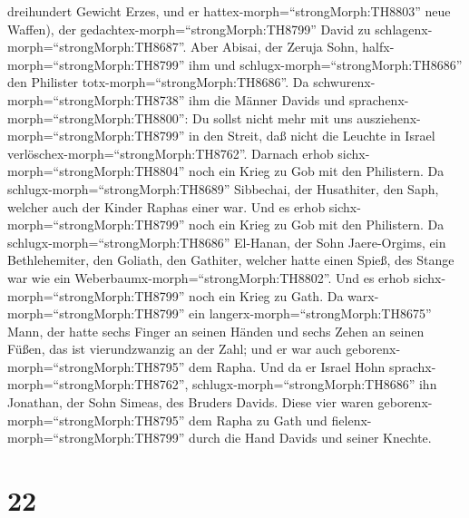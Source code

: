 dreihundert Gewicht Erzes, und er hattex-morph=``strongMorph:TH8803''
neue Waffen), der gedachtex-morph=``strongMorph:TH8799'' David zu
schlagenx-morph=``strongMorph:TH8687''.  Aber Abisai, der
Zeruja Sohn, halfx-morph=``strongMorph:TH8799'' ihm und
schlugx-morph=``strongMorph:TH8686'' den Philister
totx-morph=``strongMorph:TH8686''. Da
schwurenx-morph=``strongMorph:TH8738'' ihm die Männer Davids und
sprachenx-morph=``strongMorph:TH8800'': Du sollst nicht mehr mit uns
ausziehenx-morph=``strongMorph:TH8799'' in den Streit, daß nicht die
Leuchte in Israel verlöschex-morph=``strongMorph:TH8762''. 
Darnach erhob sichx-morph=``strongMorph:TH8804'' noch ein Krieg zu Gob
mit den Philistern. Da schlugx-morph=``strongMorph:TH8689'' Sibbechai,
der Husathiter, den Saph, welcher auch der Kinder Raphas einer war.
 Und es erhob sichx-morph=``strongMorph:TH8799'' noch ein
Krieg zu Gob mit den Philistern. Da schlugx-morph=``strongMorph:TH8686''
El-Hanan, der Sohn Jaere-Orgims, ein Bethlehemiter, den Goliath, den
Gathiter, welcher hatte einen Spieß, des Stange war wie ein
Weberbaumx-morph=``strongMorph:TH8802''.  Und es erhob
sichx-morph=``strongMorph:TH8799'' noch ein Krieg zu Gath. Da
warx-morph=``strongMorph:TH8799'' ein
langerx-morph=``strongMorph:TH8675'' Mann, der hatte sechs Finger an
seinen Händen und sechs Zehen an seinen Füßen, das ist vierundzwanzig an
der Zahl; und er war auch geborenx-morph=``strongMorph:TH8795'' dem
Rapha.  Und da er Israel Hohn
sprachx-morph=``strongMorph:TH8762'',
schlugx-morph=``strongMorph:TH8686'' ihn Jonathan, der Sohn Simeas, des
Bruders Davids.  Diese vier waren
geborenx-morph=``strongMorph:TH8795'' dem Rapha zu Gath und
fielenx-morph=``strongMorph:TH8799'' durch die Hand Davids und seiner
Knechte.

\hypertarget{section-21}{%
\section{22}\label{section-21}}

